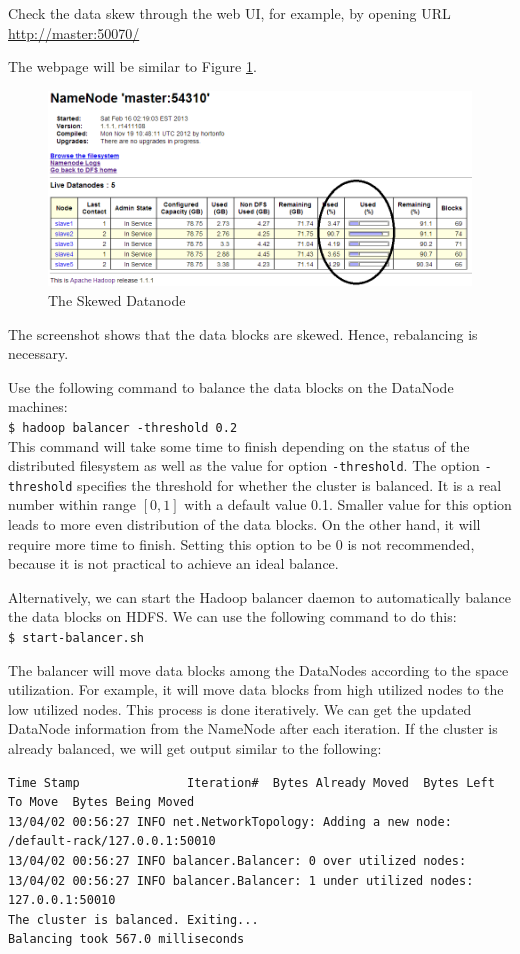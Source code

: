 Check the data skew through the web UI, for example, by opening URL \url{http://master:50070/}

The webpage will be similar to Figure \ref{fig:skewed.datanode}.
\begin{figure}[ht]
  \centering
  \includegraphics[width=.8\textwidth]{figs/5163os_07_01.png}
  \caption{The Skewed Datanode}\label{fig:skewed.datanode}
\end{figure} 
The screenshot shows that the data blocks are skewed. Hence, rebalancing is necessary.

Use the following command to balance the data blocks on the DataNode machines: \\
\verb|$ hadoop balancer -threshold 0.2| \\
This command will take some time to finish depending on the status of the distributed filesystem as well as the value for option \verb|-threshold|. The option \verb|-threshold| specifies the threshold for whether the cluster is balanced. It is a real number within range $[0, 1]$ with a default value 0.1. Smaller value for this option leads to more even distribution of the data blocks. On the other hand, it will require more time to finish. Setting this option to be 0 is not recommended, because it is not practical to achieve an ideal balance.

Alternatively, we can start the Hadoop balancer daemon to automatically balance the data blocks on HDFS. We can use the following command to do this: \\
\verb|$ start-balancer.sh|

The balancer will move data blocks among the DataNodes according to the space utilization. For example, it will move data blocks from high utilized nodes to the low utilized nodes. This process is done iteratively. We can get the updated DataNode information from the NameNode after each iteration. If the cluster is already balanced, we will get output similar to the following:
\lstset{style=bashstyle}
\begin{lstlisting}
Time Stamp               Iteration#  Bytes Already Moved  Bytes Left To Move  Bytes Being Moved
13/04/02 00:56:27 INFO net.NetworkTopology: Adding a new node: /default-rack/127.0.0.1:50010
13/04/02 00:56:27 INFO balancer.Balancer: 0 over utilized nodes:
13/04/02 00:56:27 INFO balancer.Balancer: 1 under utilized nodes:  127.0.0.1:50010
The cluster is balanced. Exiting...
Balancing took 567.0 milliseconds
\end{lstlisting}

